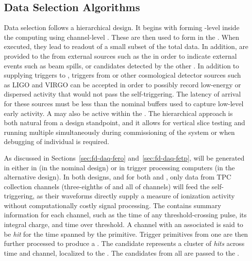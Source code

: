 

\subsection{Data Selection Algorithms}
\label{sec:fd-daq-sel}


Data selection follows a hierarchical design. 
It begins with forming -level 
inside the   computing using channel-level
. 
These are then used to form  
in the .
When executed, they lead to readout of a small subset of the total
data. 
In addition,  are provided to the
 from external sources such as the  in order to
indicate external events such as beam spills, or  candidates
detected by the other . 
In addition to supplying triggers to , triggers from
 or other cosmological detector sources such as LIGO and
VIRGO can be accepted in order to possibly record low-energy or
dispersed activity that would not pass the self-triggering. 
The latency of arrival for these sources must be less than the nominal
\snbpretime buffers used to capture low-level early 
activity.
A  may also be active within the . 
The hierarchical approach is both natural from a design standpoint, and 
it allows for vertical slice testing and running multiple
 simultaneously during commissioning of the system or
when debugging of individual  is required.

As discussed in Sections~\ref{sec:fd-daq-fero}
and~\ref{sec:fd-daq-fetp},  will be generated in
either in  (in the nominal design) or in trigger
processing computers (in the alternative design). 
In both designs, and for both  and 
, only data from TPC collection channels (three-eighths of \single and all of \dual channels) will feed
the self-triggering, as their waveforms directly supply a measure of
ionization activity without computationally costly signal processing.
The  contains summary information for each
channel, such as the time of any threshold-crossing pulse, its
integral charge, and time over threshold. 
A channel with an associated  is said to be
\textit{hit} for the time spanned by the primitive. 
Trigger primitives from one  are then further processed
to produce a . 
The candidate represents a cluster of \textit{hits} across time and
channel, localized to the .
The candidates from all  are passed to the
.


